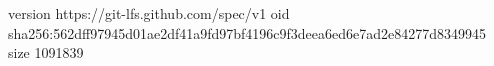 version https://git-lfs.github.com/spec/v1
oid sha256:562dff97945d01ae2df41a9fd97bf4196c9f3deea6ed6e7ad2e84277d8349945
size 1091839
